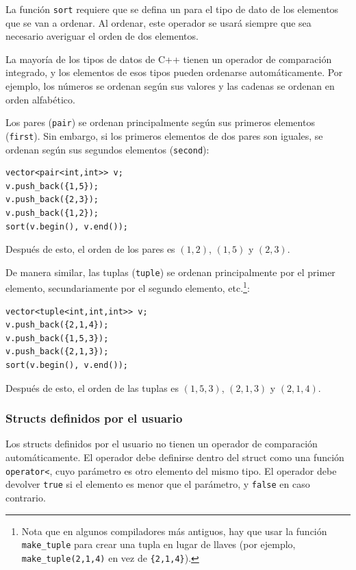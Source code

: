 
La función \texttt{sort} requiere que
se defina un  para el tipo de dato
de los elementos que se van a ordenar.
Al ordenar, este operador se usará
siempre que sea necesario averiguar el orden de dos elementos.

La mayoría de los tipos de datos de C++ tienen un operador de comparación integrado,
y los elementos de esos tipos pueden ordenarse automáticamente.
Por ejemplo, los números se ordenan según sus valores
y las cadenas se ordenan en orden alfabético.


Los pares (\texttt{pair}) se ordenan principalmente según sus
primeros elementos (\texttt{first}).
Sin embargo, si los primeros elementos de dos pares son iguales,
se ordenan según sus segundos elementos (\texttt{second}):
\begin{lstlisting}
vector<pair<int,int>> v;
v.push_back({1,5});
v.push_back({2,3});
v.push_back({1,2});
sort(v.begin(), v.end());
\end{lstlisting}
Después de esto, el orden de los pares es
$(1,2)$, $(1,5)$ y $(2,3)$.


De manera similar, las tuplas (\texttt{tuple})
se ordenan principalmente por el primer elemento,
secundariamente por el segundo elemento, etc.\footnote{Nota que en algunos compiladores más antiguos,
hay que usar la función \texttt{make\_tuple} para crear una tupla en lugar de
llaves (por ejemplo, \texttt{make\_tuple(2,1,4)} en vez de \texttt{\{2,1,4\}}).}:
\begin{lstlisting}
vector<tuple<int,int,int>> v;
v.push_back({2,1,4});
v.push_back({1,5,3});
v.push_back({2,1,3});
sort(v.begin(), v.end());
\end{lstlisting}
Después de esto, el orden de las tuplas es
$(1,5,3)$, $(2,1,3)$ y $(2,1,4)$.

\subsubsection{Structs definidos por el usuario}

Los structs definidos por el usuario no tienen un operador
de comparación automáticamente.
El operador debe definirse dentro
del struct como una función
\texttt{operator<},
cuyo parámetro es otro elemento del mismo tipo.
El operador debe devolver \texttt{true}
si el elemento es menor que el parámetro,
y \texttt{false} en caso contrario.

